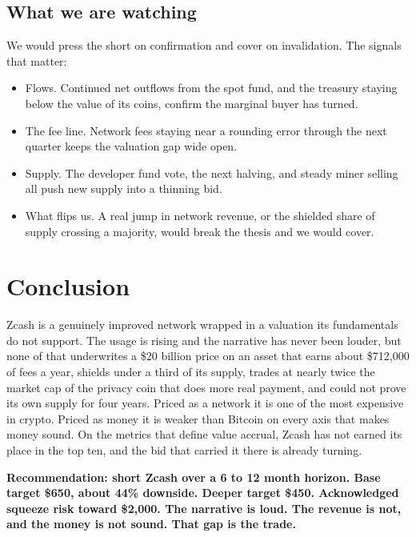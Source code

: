 \documentclass[11pt]{article}
\begin{document}
\subsection{What we are watching}
We would press the short on confirmation and cover on invalidation. The signals that matter:
\begin{itemize}
  \item Flows. Continued net outflows from the spot fund, and the treasury staying below the value of its coins, confirm the marginal buyer has turned.
  \item The fee line. Network fees staying near a rounding error through the next quarter keeps the valuation gap wide open.
  \item Supply. The developer fund vote, the next halving, and steady miner selling all push new supply into a thinning bid.
  \item What flips us. A real jump in network revenue, or the shielded share of supply crossing a majority, would break the thesis and we would cover.
\end{itemize}

\section{Conclusion}

Zcash is a genuinely improved network wrapped in a valuation its fundamentals do not support. The usage is rising and the narrative has never been louder, but none of that underwrites a \$20 billion price on an asset that earns about \$712,000 of fees a year, shields under a third of its supply, trades at nearly twice the market cap of the privacy coin that does more real payment, and could not prove its own supply for four years. Priced as a network it is one of the most expensive in crypto. Priced as money it is weaker than Bitcoin on every axis that makes money sound. On the metrics that define value accrual, Zcash has not earned its place in the top ten, and the bid that carried it there is already turning.

\textbf{Recommendation: short Zcash over a 6 to 12 month horizon. Base target \$650, about 44\% downside. Deeper target \$450. Acknowledged squeeze risk toward \$2,000. The narrative is loud. The revenue is not, and the money is not sound. That gap is the trade.}
\end{document}
